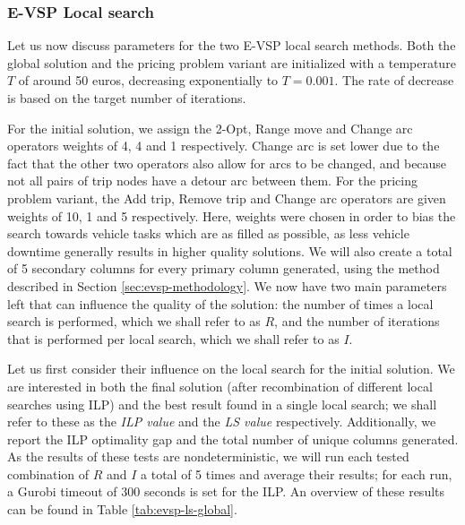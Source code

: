 \documentclass[]{article}
\begin{document}
\subsubsection{E-VSP Local search}
Let us now discuss parameters for the two E-VSP local search methods. Both the global solution and the pricing problem variant are initialized with a temperature $T$ of around 50 euros, decreasing exponentially to $T = 0.001$. The rate of decrease is based on the target number of iterations. 

For the initial solution, we assign the 2-Opt, Range move and Change arc operators weights of 4, 4 and 1 respectively. Change arc is set lower due to the fact that the other two operators also allow for arcs to be changed, and because not all pairs of trip nodes have a detour arc between them. For the pricing problem variant, the Add trip, Remove trip and Change arc operators are given weights of 10, 1 and 5 respectively. Here, weights were chosen in order to bias the search towards vehicle tasks which are as filled as possible, as less vehicle downtime generally results in higher quality solutions. We will also create a total of 5 secondary columns for every primary column generated, using the method described in Section \ref{sec:evsp-methodology}. We now have two main parameters left that can influence the quality of the solution: the number of times a local search is performed, which we shall refer to as $R$, and the number of iterations that is performed per local search, which we shall refer to as $I$. 

Let us first consider their influence on the local search for the initial solution. We are interested in both the final solution (after recombination of different local searches using ILP) and the best result found in a single local search; we shall refer to these as the \textit{ILP value} and the \textit{LS value} respectively. Additionally, we report the ILP optimality gap and the total number of unique columns generated. As the results of these tests are nondeterministic, we will run each tested combination of $R$ and $I$ a total of 5 times and average their results; for each run, a Gurobi timeout of 300 seconds is set for the ILP. An overview of these results can be found in Table \ref{tab:evsp-ls-global}.
\end{document}
